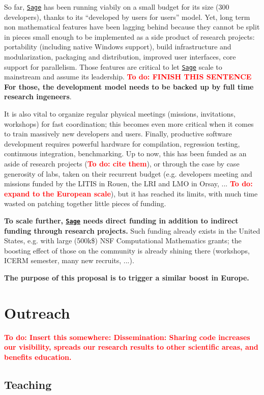 \documentclass[a4,12pt]{amsart}
\newcommand{\sage}{\href{http://www.sagemath.org/}{\texttt{Sage}}\xspace}
\newcommand{\TODO}[2][To do: ]{{\textcolor{red}{\textbf{#1#2}}}}
\begin{document}
So far, \sage has been running viabily on a small budget for its size (300
developers), thanks to its ``developed by users for users'' model. Yet,
long term non mathematical features have been lagging behind because they cannot be
split in pieces small enough to be implemented as a side product of research
projects: portability (including native Windows support), build infrastructure
and modularization, packaging and distribution, improved user interfaces, core
support for parallelism. Those features are critical to let \sage scale to
mainstream and assume its leadership.
\TODO{FINISH THIS SENTENCE}
\textbf{For those, the
development model needs to be backed up by full time research
ingeneers}.

It is also vital to organize regular physical meetings (missions,
invitations, workshops) for fast coordination; this becomes even more
critical when it comes to train massively new developers and users.
Finally, productive software development requires powerful hardware for
compilation, regression testing, continuous integration,
benchmarking.
%
Up to now, this has been funded as an aside of research
projects (\TODO{cite them}), or through the case by case generosity of
labs, taken on their recurrent budget (e.g. developers meeting and
missions funded by the LITIS in Rouen, the LRI and LMO in Orsay,
... \TODO{expand to the European scale}), but it has reached its
limits, with much time wasted on patching together little pieces of
funding.
%



\textbf{To scale further, \sage needs direct funding in addition to
  indirect funding through research projects.} Such funding already
exists in the United States, e.g. with large (500k\$) NSF
Computational Mathematics grants; the boosting effect of those on the
community is already shining there (workshops, ICERM semester, many
new recruits, ...).

\medskip
\textbf{The purpose of this proposal is to trigger a similar boost in
  Europe.}

\section{Outreach}

\TODO{Insert this somewhere: Dissemination: Sharing code increases our
  visibility, spreads our research results to other scientific areas,
  and benefits education.}

\subsection{Teaching}
\end{document}
